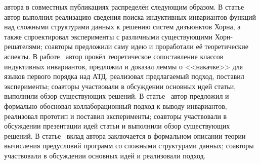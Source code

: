 
{\contribution} автора в совместных публикациях распределён следующим образом.
В статье~\cite{костюков2019автоматическое} автор выполнил реализацию сведения поиска индуктивных инвариантов функций над сложными структурами данных к решению систем дизъюнктов Хорна, а также спроектировал эксперименты с различными существующими Хорн-решателями; соавторы предложили саму идею и проработали её теоретические аспекты.
В работе~\cite{10.1145/3453483.3454055} автор провёл теоретическое сопоставление классов индуктивных инвариантов, предложил и доказал леммы о <<накачке>> для языков первого порядка над АТД, реализовал предлагаемый подход, поставил эксперименты; соавторы участвовали в обсуждении основных идей статьи, выполнили обзор существующих решений.
В статье~\cite{LPAR2023:Collaborative_Inference_of_Combined} автор предложил и формально обосновал коллаборационный подход к выводу инвариантов, реализовал прототип и поставил эксперименты; соавторы участвовали в обсуждении презентации идей статьи и выполнили обзор существующих решений.
В статье~\cite{мисонижник2022генерация} вклад автора заключается в формальном описании теории вычисления предусловий программ со сложными структурами данных; соавторы участвовали в обсуждении основных идей и реализовали подход.
